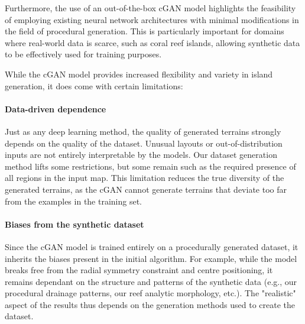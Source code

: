 Furthermore, the use of an out-of-the-box cGAN model highlights the feasibility of employing existing neural network architectures with minimal modifications in the field of procedural generation. This is particularly important for domains where real-world data is scarce, such as coral reef islands, allowing synthetic data to be effectively used for training purposes.


While the cGAN model provides increased flexibility and variety in island generation, it does come with certain limitations:

\paragraph{Data-driven dependence} Just as any deep learning method, the quality of generated terrains strongly depends on the quality of the dataset. Unusual layouts or out-of-distribution inputs are not entirely interpretable by the models. Our dataset generation method lifts some restrictions, but some remain such as the required presence of all regions in the input map. This limitation reduces the true diversity of the generated terrains, as the cGAN cannot generate terrains that deviate too far from the examples in the training set.
\paragraph{Biases from the synthetic dataset} Since the cGAN model is trained entirely on a procedurally generated dataset, it inherits the biases present in the initial algorithm. For example, while the model breaks free from the radial symmetry constraint and centre positioning, it remains dependant on the structure and patterns of the synthetic data (e.g., our procedural drainage patterns, our reef analytic morphology, etc.). %
The "realistic" aspect of the results thus depends on the generation methods used to create the dataset.

